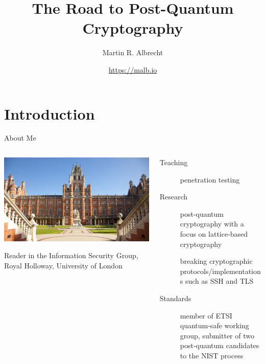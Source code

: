 \documentclass[xcolor=table,10pt,aspectratio=169]{beamer}
\author{Martin R. Albrecht}
\date{\url{https://malb.io}}
\title{The Road to Post-Quantum Cryptography}
\begin{document}
\maketitle

\section{Introduction}
\label{sec:orgd3cfc43}
\begin{frame}[label={sec:org0e78798}]{About Me}
\begin{columns}[t]
\begin{column}{0.4\columnwidth}
\begin{center}
\includegraphics[width=\linewidth]{./rhul.jpeg}
\end{center}

Reader in the Information Security Group, Royal Holloway, University of London
\end{column}

\begin{column}{0.6\columnwidth}
\begin{description}
\item[{Teaching}] penetration testing
\item[{Research}] post-quantum cryptography with a focus on lattice-based cryptography \cite{EC:Albrecht17,EC:ADHKPS19}

breaking cryptographic protocols/implementations such as SSH \cite{SP:AlbPatWat09,CCS:ADHP16} and TLS \cite{EC:AlbPat16,CCS:AMPS18}

\item[{Standards}] member of ETSI quantum-safe working group, submitter of two post-quantum candidates to the NIST process
\end{description}
\end{column}
\end{columns}
\end{frame}
\end{document}

